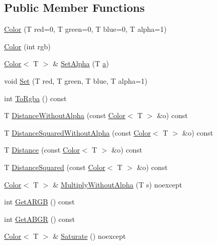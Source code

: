 \subsection*{Public Member Functions}
\begin{DoxyCompactItemize}
\item 
\hyperlink{classastu_1_1Color_abb0e2cdad572357375d5b2465ea847b9}{Color} (T red=0, T green=0, T blue=0, T alpha=1)
\item 
\hyperlink{classastu_1_1Color_a1ce283cfd9542b85da611fc50a4a9e54}{Color} (int rgb)
\item 
\hyperlink{classastu_1_1Color}{Color}$<$ T $>$ \& \hyperlink{classastu_1_1Color_a0fcfa896c3a32ae0af1aeec3f4d866fe}{Set\+Alpha} (T \hyperlink{classastu_1_1Color_ad62b3af3464dea4bf99432bfb6e9d796}{a})
\item 
void \hyperlink{classastu_1_1Color_ad5aaf54919fed257c37b6b5747bd01c8}{Set} (T red, T green, T blue, T alpha=1)
\item 
int \hyperlink{classastu_1_1Color_a376a9d08b37e917a7040d58aab009bf5}{To\+Rgba} () const
\item 
T \hyperlink{classastu_1_1Color_a4802f8f0d0fcf65ba6853ac17c52b811}{Distance\+Without\+Alpha} (const \hyperlink{classastu_1_1Color}{Color}$<$ T $>$ \&o) const
\item 
T \hyperlink{classastu_1_1Color_a35549a6d06ab1fbc8a232508e3041f9d}{Distance\+Squared\+Without\+Alpha} (const \hyperlink{classastu_1_1Color}{Color}$<$ T $>$ \&o) const
\item 
T \hyperlink{classastu_1_1Color_aa61d12089e02ec0ce02ab877b21c6bcc}{Distance} (const \hyperlink{classastu_1_1Color}{Color}$<$ T $>$ \&o) const
\item 
T \hyperlink{classastu_1_1Color_a9b396fa9b0d3612ec9eb372b52de1eac}{Distance\+Squared} (const \hyperlink{classastu_1_1Color}{Color}$<$ T $>$ \&o) const
\item 
\hyperlink{classastu_1_1Color}{Color}$<$ T $>$ \& \hyperlink{classastu_1_1Color_a662946707019ddc5d79612da685be5f8}{Multiply\+Without\+Alpha} (T s) noexcept
\item 
int \hyperlink{classastu_1_1Color_aa7c679fe7a6c4b11ea163bc1d64fd73b}{Get\+A\+R\+GB} () const
\item 
int \hyperlink{classastu_1_1Color_a11cf3e00ee1662cc67aae0fa5767df39}{Get\+A\+B\+GR} () const
\item 
\hyperlink{classastu_1_1Color}{Color}$<$ T $>$ \& \hyperlink{classastu_1_1Color_a60780325071ef6c95b113f9f5f9905b4}{Saturate} () noexcept
\item 

\end{DoxyCompactItemize}
